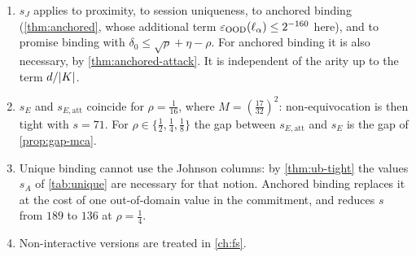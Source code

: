 \begin{remark}\label{rem:johnson-reading}
\begin{enumerate}[label=\textup{(\roman*)}]
\item $s_J$ applies to proximity, to session uniqueness, to anchored binding
(\cref{thm:anchored}, whose additional term $\varepsilon_{\mathrm{OOD}}(\ell_\alpha)\le2^{-160}$ here),
and to promise binding with $\delta_0\le\sqrt\rho+\eta-\rho$. For anchored binding it is
also necessary, by \cref{thm:anchored-attack}. It is independent of the arity up to the term
$d/|K|$.
\item $s_E$ and $s_{E,\mathrm{att}}$ coincide for $\rho=\frac1{16}$, where
$M=(\frac{17}{32})^2$: non-equivocation is then tight with $s=71$. For
$\rho\in\{\frac12,\frac14,\frac18\}$ the gap between $s_{E,\mathrm{att}}$ and $s_E$ is the
gap of \cref{prop:gap-mca}.
\item Unique binding cannot use the Johnson columns: by \cref{thm:ub-tight} the values
$s_A$ of \cref{tab:unique} are necessary for that notion. Anchored binding replaces it at
the cost of one out-of-domain value in the commitment, and reduces $s$ from $189$ to $136$ at
$\rho=\frac14$.
\item Non-interactive versions are treated in \cref{ch:fs}.
\end{enumerate}
\end{remark}
